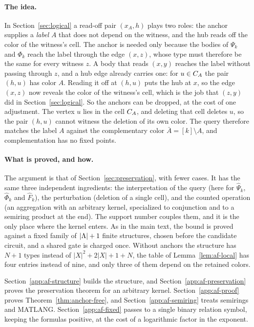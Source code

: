 \paragraph{The idea.}
In Section~\ref{sec:logical} a read-off pair $(x_A,h)$ plays two roles: the
anchor supplies a \emph{label} $A$ that does not depend on the witness, and
the hub reads off the color of the witness's cell. The anchor is needed only
because the bodies of $\Psi_k$ and $\Phi_k$ reach the label through the edge
$(x,z)$, whose type must therefore be the same for every witness $z$. A body
that reads $(x,y)$ reaches the label without passing through $z$, and a hub
edge already carries one: for $u\in C_{A}$ the pair $(h,u)$ has color $A$.
Reading it off at $(h,u)$ puts the hub at $x$, so the edge $(x,z)$ now
reveals the color of the witness's cell, which is the job that $(z,y)$ did
in Section~\ref{sec:logical}. So the anchors can be dropped, at the cost of
one adjustment. The vertex $u$ lies in the cell $C_{A}$, and deleting that
cell deletes $u$, so the pair $(h,u)$ cannot witness the deletion of its own
color. The query therefore
matches the label $A$ against the complementary color $\bar A=[k]\setminus
A$, and complementation has no fixed points.

\paragraph{What is proved, and how.}
The argument is that of Section~\ref{sec:preservation}, with fewer cases.
It has the same three independent ingredients: the interpretation of the
query (here for $\widehat\Psi_k$, $\widehat\Phi_k$ and $\widehat F_k$), the
perturbation (deletion of a single cell), and the counted operation (an
aggregation with an arbitrary kernel, specialized to conjunction and to a
semiring product at the end). The support number couples them, and it is
the only place where the kernel enters. As in the main text, the bound is
proved against a fixed family of $|\Lambda|+1$ finite structures, chosen
before the candidate circuit, and a shared gate is charged once. Without
anchors the structure has $N+1$ types instead of
$|X|^2+2|X|+1+N$, the table of Lemma~\ref{lem:af-local} has four entries
instead of nine, and only three of them depend on the retained colors.

Section~\ref{app:af-structure} builds the structure, and
Section~\ref{app:af-preservation} proves the preservation theorem for an
arbitrary kernel. Section~\ref{app:af-proof} proves
Theorem~\ref{thm:anchor-free}, and Section~\ref{app:af-semiring} treats
semirings and MATLANG. Section~\ref{app:af-fixed} passes to a single
binary relation symbol, keeping the formulas positive, at the cost of a
logarithmic factor in the exponent.


